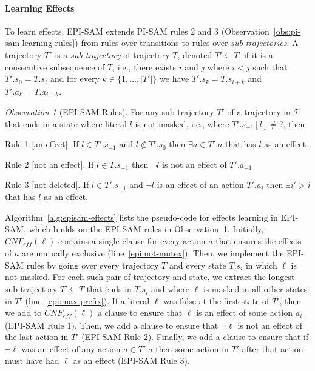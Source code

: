 \documentclass{article}
\theoremstyle{plain}
\theoremstyle{definition}
\theoremstyle{remark}
\theoremstyle{observation}
\newtheorem{observation}[theorem]{Observation}
\newcommand{\eff}{\textit{eff}}
\newcommand{\cnf}{\textit{CNF}}
\newcommand{\true}{\textit{true}}
\newcommand{\unobserved}{\textit{?}}
\begin{document}
\paragraph{Learning Effects}
To learn effects, EPI-SAM extends PI-SAM rules 2 and 3 (Observation~\ref{obs:pi-sam-learning-rules}) from rules over transitions to rules over \emph{sub-trajectories}. 
A trajectory $T'$ is a \emph{sub-trajectory} of trajectory $T$, denoted $T'\subseteq T$, if it is a consecutive subsequence of $T$, i.e., there exists $i$ and $j$ where $i<j$ such that  $T'.s_0=T.s_i$ 
and for every $k\in \{1,\ldots,|T'|\}$ we have $T'.s_k=T.s_{i+k}$ and $T'.a_k=T.a_{i+k}$. 

\begin{observation}[EPI-SAM Rules]
For any sub-trajectory $T'$ of a trajectory in $\mathcal{T}$ that ends in a state where literal $l$ is not masked, i.e., where $T'.s_{-1}[l]\neq\unobserved$, then
    \begin{compactitem}
        \item[Rule 1][an effect]. 
        If $l\in T'.s_{-1}$ and $l\notin T'.s_0$ 
        then $\exists a\in T'.a$ that has $l$ as an effect. 
        \item[Rule 2][not an effect]. 
        If $l\in T.s_{-1}$ then $\neg l$ is not an effect of $T'.a_{-1}$
        \item[Rule 3][not deleted].%
        If $l\in T'.s_{-1}$ and $\neg l$ is an effect of an action $T'.a_i$ then $\exists i'>i$ that has $l$ as an effect. 
    \end{compactitem}
\label{obs:epi-sam-learning-rules}
\end{observation}
Algorithm~\ref{alg:episam-effects} lists the pseudo-code for effects learning in EPI-SAM, which builds on the EPI-SAM rules in  Observation~\ref{obs:epi-sam-learning-rules}. 
Initially, $\cnf_\eff(\ell)$ contains a single clause for every action $a$ that ensures the effects of $a$ are mutually exclusive (line~\ref{epi:not-mutex}). 
Then, we implement the EPI-SAM rules by going over every trajectory $T$ and every state $T.s_i$ in which $\ell$ is not masked. 
For each such pair of trajectory and state, we extract the longest sub-trajectory $T'\subseteq T$ that ends in $T.s_i$ and where $\ell$ is masked in all other states in $T'$ (line~\ref{epi:max-prefix}). 
If a literal $\ell$ was false at the first state of $T'$, then we add to $\cnf_\eff(\ell)$ a clause to ensure that $\ell$ is an effect of some action $a_i$ (EPI-SAM Rule 1). 
Then, we add a clause to ensure that $\neg\ell$ is not an effect of the last action in $T'$ (EPI-SAM Rule 2). 
Finally, we add a clause to ensure that if $\neg \ell$ was an effect of any action $a\in T'.a$ 
then some action in $T'$ after that action must have had $\ell$ as an effect (EPI-SAM Rule 3). 
\end{document}
